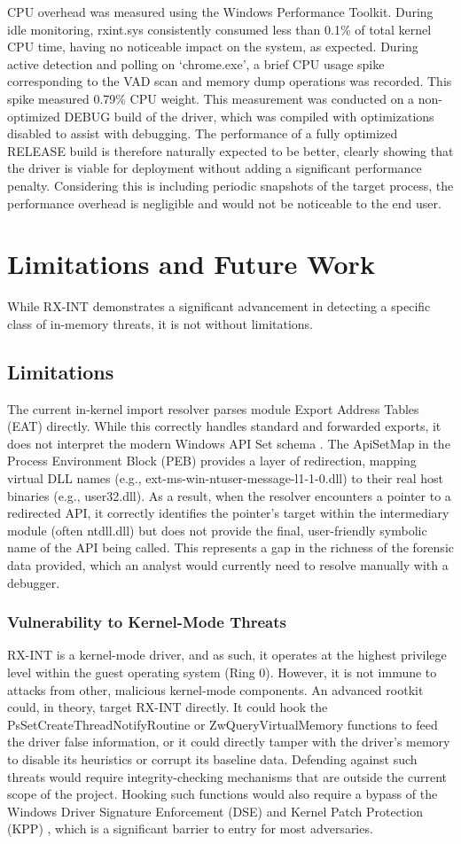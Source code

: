 \documentclass[journal]{IEEEtran}
\begin{document}
CPU overhead was measured using the Windows Performance Toolkit. During idle monitoring, rxint.sys consistently consumed less than 0.1\% of total kernel CPU time, having no noticeable impact on the system, as expected. During active detection and polling on `chrome.exe', a brief CPU usage spike corresponding to the VAD scan and memory dump operations was recorded. This spike measured 0.79\% CPU weight. This measurement was conducted on a non-optimized DEBUG build of the driver, which was compiled with optimizations disabled to assist with debugging. The performance of a fully optimized RELEASE build is therefore naturally expected to be better, clearly showing that the driver is viable for deployment without adding a significant performance penalty. Considering this is including periodic snapshots of the target process, the performance overhead is negligible and would not be noticeable to the end user.

\section{Limitations and Future Work}
\label{sec:limitations}
While RX-INT demonstrates a significant advancement in detecting a specific class of in-memory threats, it is not without limitations.
\subsection{Limitations}
The current in-kernel import resolver parses module Export Address Tables (EAT) directly. While this correctly handles standard and forwarded exports, it does not interpret the modern Windows API Set schema \cite{MSDN_APISets}. The ApiSetMap in the Process Environment Block (PEB) provides a layer of redirection, mapping virtual DLL names (e.g., ext-ms-win-ntuser-message-l1-1-0.dll) to their real host binaries (e.g., user32.dll). As a result, when the resolver encounters a pointer to a redirected API, it correctly identifies the pointer's target within the intermediary module (often ntdll.dll) but does not provide the final, user-friendly symbolic name of the API being called. This represents a gap in the richness of the forensic data provided, which an analyst would currently need to resolve manually with a debugger.
\subsubsection{Vulnerability to Kernel-Mode Threats}
RX-INT is a kernel-mode driver, and as such, it operates at the highest privilege level within the guest operating system (Ring 0). However, it is not immune to attacks from other, malicious kernel-mode components. An advanced rootkit could, in theory, target RX-INT directly. It could hook the PsSetCreateThreadNotifyRoutine or ZwQueryVirtualMemory functions to feed the driver false information, or it could directly tamper with the driver's memory to disable its heuristics or corrupt its baseline data. Defending against such threats would require integrity-checking mechanisms that are outside the current scope of the project. Hooking such functions would also require a bypass of the Windows Driver Signature Enforcement (DSE) and Kernel Patch Protection (KPP) \cite{microsoftDSE}, which is a significant barrier to entry for most adversaries.
\end{document}
